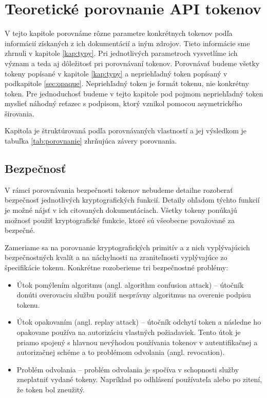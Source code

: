 \chapter{Teoretické porovnanie API tokenov}

\label{kap:teoreticke} %

V tejto kapitole porovnáme rôzne parametre konkrétnych tokenov podľa informácií získaných z ich dokumentácií a iným zdrojov. Tieto informácie sme zhrnuli v kapitole \ref{kap:typy}. Pri jednotlivých parametroch vysvetlíme ich význam a teda aj dôležitosť pri porovnávaní tokenov. Porovnávať budeme všetky tokeny popísané v kapitole \ref{kap:typy} a nepriehľadný token popísaný v podkapitole \ref{sec:opaque}. Nepriehľadný token je formát tokenu, nie konkrétny token. Pre jednoduchosť budeme v tejto kapitole pod pojmom nepriehľadný token myslieť náhodný reťazec s podpisom, ktorý vznikol pomocou asymetrického širovania. 

Kapitola je štruktúrovaná podľa porovnávaných vlastností a jej výsledkom je tabuľka \ref{tab:porovnanie} zhrňujúca závery porovnania.

\section{Bezpečnosť}

V rámci porovnávania bezpečnosti tokenov nebudeme detailne rozoberať bezpečnosť jednotlivých kryptografických funkcií. Detaily ohľadom týchto funkcií je možné nájsť v ich citovaných dokumentáciach. Všetky tokeny ponúkajú možnosť použiť kryptografické funkcie, ktoré sú všeobecne považované za bezpečné.

Zameriame sa na porovnanie kryptografických primitív a z nich vyplývajúcich bezpečnostných kvalít a na náchylnosti na zraniteľnosti vyplývajúce zo špecifikácie tokenu. Konkrétne rozoberieme tri bezpečnostné problémy:

\begin{itemize}
    \item Útok pomýlením algoritmu (angl. algorithm confusion attack) -- útočník donúti overovaciu službu použiť nesprávny algoritmus na overenie podpisu tokenu. 
    \item Útok opakovaním (angl. replay attack) -- útočník odchytí token a následne ho opakovane používa na autorizáciu vlastných požiadaviek. Tento útok je priamo spojený s hlavnou nevýhodou používania tokenov v autentifikačnej a autorizačnej schéme a to problémom odvolania (angl. revocation).
    \item Problém odvolania -- problém odvolania je spočíva v schopnosti služby zneplatniť vydané tokeny. Napríklad po odhlásení používateľa alebo po zitení, že token bol zneužitý.
\end{itemize}

